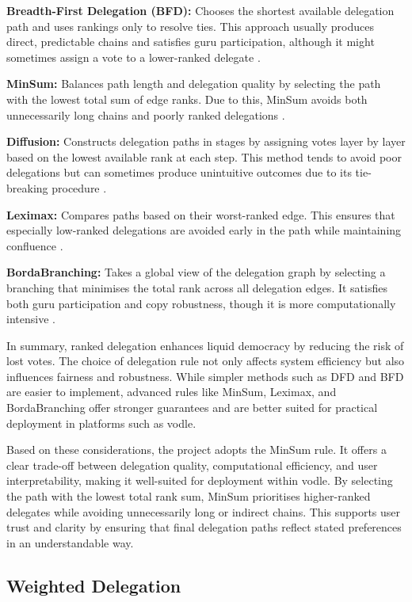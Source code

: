 \textbf{Breadth-First Delegation (BFD):} Chooses the shortest available delegation path and uses rankings only to resolve ties. This approach usually produces direct, predictable chains and satisfies guru participation, although it might sometimes assign a vote to a lower-ranked delegate \citep{kotsialou_riley_2020, brill_liquid_2022}.

\textbf{MinSum:} Balances path length and delegation quality by selecting the path with the lowest total sum of edge ranks. Due to this, MinSum avoids both unnecessarily long chains and poorly ranked delegations \citep{brill_liquid_2022}.

\textbf{Diffusion:} Constructs delegation paths in stages by assigning votes layer by layer based on the lowest available rank at each step. This method tends to avoid poor delegations but can sometimes produce unintuitive outcomes due to its tie-breaking procedure \citep{brill_liquid_2022}.

\textbf{Leximax:} Compares paths based on their worst-ranked edge. This ensures that especially low-ranked delegations are avoided early in the path while maintaining confluence \citep{brill_liquid_2022}.

\textbf{BordaBranching:} Takes a global view of the delegation graph by selecting a branching that minimises the total rank across all delegation edges. It satisfies both guru participation and copy robustness, though it is more computationally intensive \citep{brill_liquid_2022}.

In summary, ranked delegation enhances liquid democracy by reducing the risk of lost votes. The choice of delegation rule not only affects system efficiency but also influences fairness and robustness. While simpler methods such as DFD and BFD are easier to implement, advanced rules like MinSum, Leximax, and BordaBranching offer stronger guarantees and are better suited for practical deployment in platforms such as vodle.

Based on these considerations, the project adopts the MinSum rule. It offers a clear trade-off between delegation quality, computational efficiency, and user interpretability, making it well-suited for deployment within vodle. By selecting the path with the lowest total rank sum, MinSum prioritises higher-ranked delegates while avoiding unnecessarily long or indirect chains. This supports user trust and clarity by ensuring that final delegation paths reflect stated preferences in an understandable way.


\subsection*{Weighted Delegation}\label{subsec:background_weighted_delegation}

